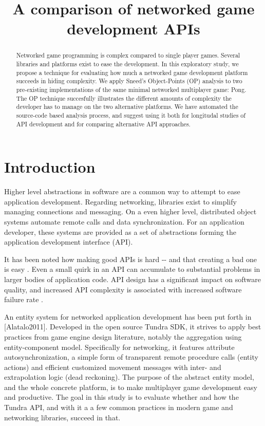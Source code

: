 \documentclass[conference]{IEEEtran}
\title{\phantomsection%
  A comparison of networked game development APIs%
  \label{a-comparison-of-networked-game-development-apis}}
\author{}
\date{}
\begin{document}
\maketitle
\begin{abstract}
Networked game programming is complex compared to single
player games. Several libraries and platforms exist to ease the
development. In this exploratory study, we propose a technique for
evaluating how much a networked game development platform succeeds
in hiding complexity. We apply Sneed's Object-Points (OP) analysis
to two pre-existing implementations of the same minimal networked
multiplayer game: Pong. The OP technique succesfully illustrates
the different amounts of complexity the developer has to manage on
the two alternative platforms. We have automated the source-code
based analysis process, and suggest using it both for longitudal
studies of API development and for comparing alternative API
approaches.
\end{abstract}


\section{Introduction%
  \label{introduction}%
}

Higher level abstractions in software are a common way to attempt to
ease application development. Regarding networking, libraries exist to
simplify managing connections and messaging. On a even higher level,
distributed object systems automate remote calls and data
synchronization. For an application developer, these systems are
provided as a set of abstractions forming the application development
interface (API).

It has been noted how making good APIs is hard -{}- and that creating a
bad one is easy \cite{api-matters}. Even a small quirk in an API can
accumulate to substantial problems in larger bodies of application
code. API design has a significant impact on software quality, and
increased API complexity is associated with increased software failure
rate \cite{cmu-api_failures}.

An entity system for networked application development has been put
forth in {[}Alatalo2011{]}. Developed in the open source Tundra SDK, it
strives to apply best practices from game engine design literature,
notably the aggregation using entity-component model. Specifically for
networking, it features attribute autosynchronization, a simple form
of transparent remote procedure calls (entity actions) and efficient
customized movement messages with inter- and extrapolation logic (dead
reckoning). The purpose of the abstract entity model, and the whole
concrete platform, is to make multiplayer game development easy and
productive. The goal in this study is to evaluate whether and how the
Tundra API, and with it a a few common practices in modern game and
networking libraries, succeed in that.
\end{document}
